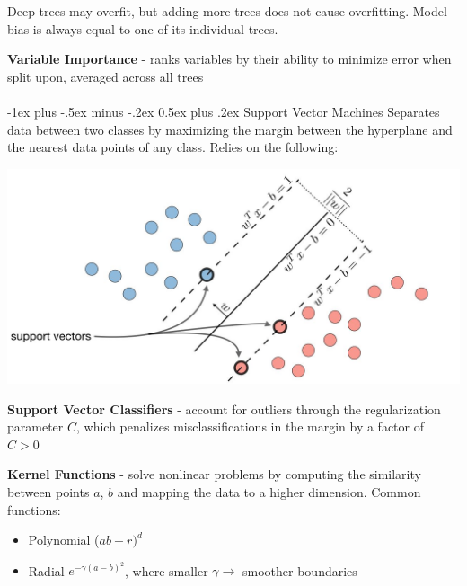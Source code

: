 \documentclass[10pt,landscape]{article}
\makeatletter
\renewcommand{\section}{\@startsection{section}{1}{0mm}%
                                {-1ex plus -.5ex minus -.2ex}%
                                {0.5ex plus .2ex}%
                                {\normalfont\large\bfseries}}
\makeatother
\begin{document}
\begin{multicols}{3}
    Deep trees may overfit, but adding more trees does not cause overfitting. Model bias is always equal to one of its individual trees.

    \textbf{Variable Importance} - ranks variables by their ability to minimize error when split upon, averaged across all trees
    \columnbreak
    \\\textcolor{white}{.}\vspace{-5mm}\\ %

    \section{Support Vector Machines}
    Separates data between two classes by maximizing the margin between the hyperplane and the nearest data points of any class. Relies on the following:
    \vspace{-2.5mm}
    \begin{center}
        \includegraphics[scale = .23]{images/svmNew2.JPG}
    \end{center}
    \vspace{-2mm}
    \textbf{Support Vector Classifiers} - account for outliers through the regularization parameter $C$, which penalizes misclassifications in the margin by a factor of $C > 0$

    \textbf{Kernel Functions} - solve nonlinear problems by computing the similarity between points $a$, $b$ and mapping the data to a higher dimension. Common functions:
    \begin{itemize}[label={--},leftmargin=4mm]
        \vspace{-1mm}
        \itemsep -.4mm
        \item Polynomial ($ab + r)^d$
        \item Radial $e^{-\gamma(a-b)^2}$, where smaller $\gamma \to$  smoother boundaries
    \end{itemize}


\end{multicols}
\end{document}
